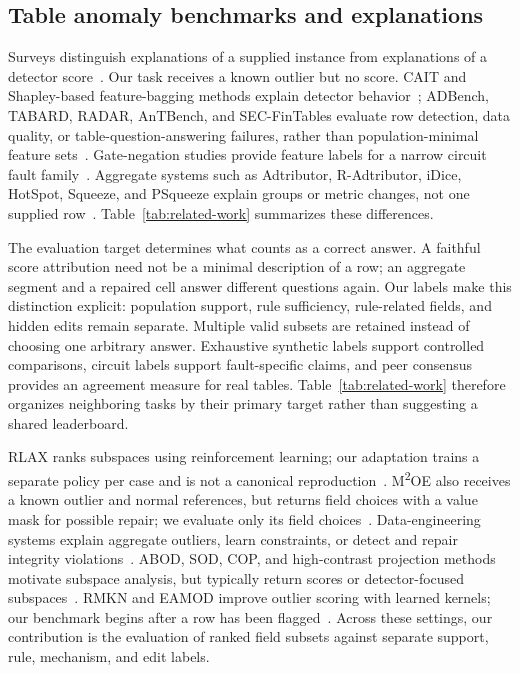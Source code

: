 \documentclass[conference]{IEEEtran}
\begin{document}
\subsection{Table anomaly benchmarks and explanations}
Surveys distinguish explanations of a supplied instance from explanations of a detector score~\cite{panjei2022survey,li2024xadsurvey}. Our task receives a known outlier but no score. CAIT and Shapley-based feature-bagging methods explain detector behavior~\cite{mok2025cait,kluttermann2024shapley}; ADBench, TABARD, RADAR, AnTBench, and SEC-FinTables evaluate row detection, data quality, or table-question-answering failures, rather than population-minimal feature sets~\cite{han2022adbench,choudhury2025tabard,gu2025radar,wei2026antbench,ke2026secfintables}. Gate-negation studies provide feature labels for a narrow circuit fault family~\cite{antwarg2024groundtruth,myrtakis2021comparative}. Aggregate systems such as Adtributor, R-Adtributor, iDice, HotSpot, Squeeze, and PSqueeze explain groups or metric changes, not one supplied row~\cite{bhagwan2014adtributor,persson2018radtributor,lin2016idice,sun2018hotspot,li2019squeeze,li2023psqueeze}. Table~\ref{tab:related-work} summarizes these differences.

The evaluation target determines what counts as a correct answer. A faithful score attribution need not be a minimal description of a row; an aggregate segment and a repaired cell answer different questions again. Our labels make this distinction explicit: population support, rule sufficiency, rule-related fields, and hidden edits remain separate. Multiple valid subsets are retained instead of choosing one arbitrary answer. Exhaustive synthetic labels support controlled comparisons, circuit labels support fault-specific claims, and peer consensus provides an agreement measure for real tables. Table~\ref{tab:related-work} therefore organizes neighboring tasks by their primary target rather than suggesting a shared leaderboard.

RLAX ranks subspaces using reinforcement learning; our adaptation trains a separate policy per case and is not a canonical reproduction~\cite{amirato2026rlax}. M\textsuperscript{2}OE also receives a known outlier and normal references, but returns field choices with a value mask for possible repair; we evaluate only its field choices~\cite{angiulli2024m2oe}. Data-engineering systems explain aggregate outliers, learn constraints, or detect and repair integrity violations~\cite{wu2013scorpion,chen2025autotest,chu2013holistic,rekatsinas2017holoclean,li2025autodcworkflow}. ABOD, SOD, COP, and high-contrast projection methods motivate subspace analysis, but typically return scores or detector-focused subspaces~\cite{kriegel2008abod,kriegel2009sod,kriegel2012cop,muller2011subspace,keller2012hics}. RMKN and EAMOD improve outlier scoring with learned kernels; our benchmark begins after a row has been flagged~\cite{wang2024rmkn,wang2024eamod}. Across these settings, our contribution is the evaluation of ranked field subsets against separate support, rule, mechanism, and edit labels.
\end{document}
